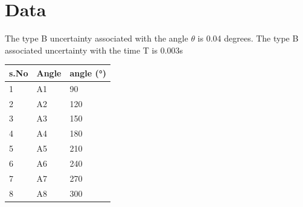 

\section{Data}

The type B uncertainty associated with the angle $\theta$ is 0.04 degrees. The type B associated uncertainty with the time T is $0.003$s

\begin{center}
\begin{tabular}{|l|l|l|}
\hline
\textbf{s.No} & \textbf{Angle} & \textbf{angle (°)} \\ \hline
1             & A1             & 90                 \\ \hline
2             & A2             & 120                \\ \hline
3             & A3             & 150                \\ \hline
4             & A4             & 180                \\ \hline
5             & A5             & 210                \\ \hline
6             & A6             & 240                \\ \hline
7             & A7             & 270                \\ \hline
8             & A8             & 300                \\ \hline
\end{tabular}
\end{center}

